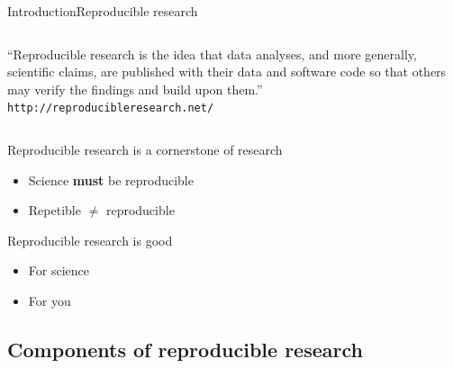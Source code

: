 \documentclass{beamer}
\begin{document}
\begin{frame}{Introduction}{Reproducible research}
	\vspace{-0.3cm}
	\begin{center}
	\begin{columns}
	\begin{block}{}
	\begin{center}
	``Reproducible research is the idea that data analyses, and more generally, scientific claims, are published with their data and software code so that others may verify the findings and build upon them.''\\ 
	\texttt{http://reproducibleresearch.net/}
	\end{center}
	\end{block}
	\end{columns}
	\end{center}
	
	Reproducible research is a cornerstone of research
    \begin{itemize}
	\item Science \textbf{must} be reproducible
    \item Repetible $\ne$ reproducible
    \end{itemize}

    Reproducible research is good
    \begin{itemize}
    \item For science
    \item For you
    \end{itemize}
\end{frame}

\subsection{Components of reproducible research}
\end{document}
